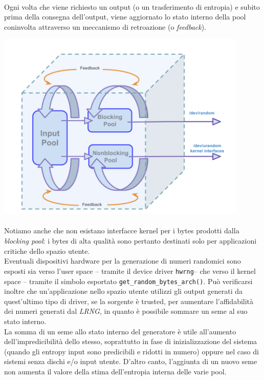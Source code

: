 \documentclass{article}
\begin{document}
 \paragraph{} Ogni volta che viene richiesto un output (o un trasferimento di
 entropia) e subito prima della consegna dell'output, viene aggiornato lo stato
 interno della pool coninvolta attraverso un meccanismo di retroazione (o
 \emph{feedback}).
 
   \centerline{\includegraphics[width=120mm]{img/feedback.png}}
 
 
 \paragraph{}Notiamo anche che non esistano interfacce kernel per i bytes
 prodotti dalla \emph{blocking pool}: i bytes di alta qualità sono pertanto destinati
 solo per applicazioni critiche dello spazio utente. \\
 Eventuali dispositivi hardware per la generazione di numeri
 randomici sono esposti sia verso l'user space -- tramite il device driver
 \verb+hwrng+-- che verso il kernel space -- tramite il simbolo esportato 
 \verb+get_random_bytes_arch()+. Può verificarsi inoltre che un'applicazione
 nello spazio utente utilizzi gli output generati da quest'ultimo tipo di
 driver, se la sorgente è trusted, per aumentare l'affidabilità dei numeri
 generati dal \emph{LRNG}, in quanto è possibile sommare un
 seme al suo stato interno.
 \\
 La somma di un seme allo stato interno del generatore è utile all'aumento
 dell'impredicibilità dello stesso, soprattutto in fase di inizializzazione del
 sistema (quando gli entropy input sono predicibili e ridotti in numero) oppure
 nel caso di sistemi senza dischi e/o input utente. D'altro canto, l'aggiunta di
 un nuovo seme non aumenta il valore della stima dell'entropia interna delle
 varie pool.
\end{document}
